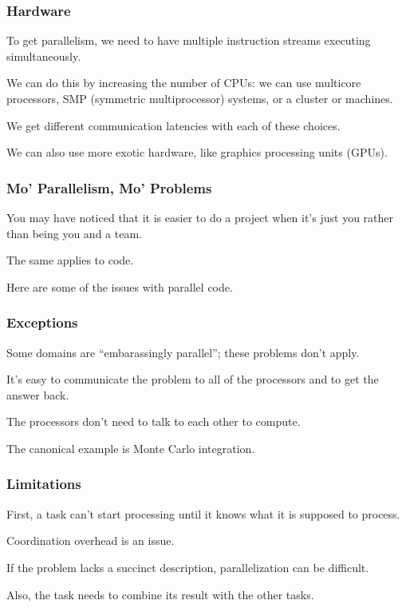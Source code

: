 \begin{frame}
\frametitle{Hardware}

To get parallelism, we need to have multiple instruction
streams executing simultaneously. 

We can do this by increasing the
number of CPUs: we can use multicore processors, SMP (symmetric
multiprocessor) systems, or a cluster or machines. 

We get different
communication latencies with each of these choices.

We can also use more exotic hardware, like graphics processing units
(GPUs).

\end{frame}



\begin{frame}
\frametitle{Mo' Parallelism, Mo' Problems}
You may have noticed that it is easier to do a project when it's just
you rather than being you and a team. 

The same applies to code.

Here are some of the issues with parallel code.


\end{frame}



\begin{frame}
\frametitle{Exceptions}

Some domains are ``embarassingly parallel''; these problems
don't apply. 

It's easy to communicate the problem to all of the processors and to get the answer back.
 
The processors don't need to talk to each other to compute. 

The canonical
example is Monte Carlo integration.


\end{frame}



\begin{frame}
\frametitle{Limitations}

First, a task can't start processing until it knows what it
is supposed to process. 

Coordination overhead is an issue. 

If the
problem lacks a succinct description, parallelization can be
difficult. 

Also, the task needs to combine its result with the other
tasks.

\end{frame}



